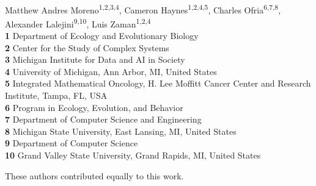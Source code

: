 \begin{flushleft}
{\Large
\textbf{} %
}
{\large
\textit{} %
}
\newline
\\
Matthew Andres Moreno\textsuperscript{1,2,3,4\Yinyang*},
Cameron Haynes\textsuperscript{1,2,4,5\Yinyang},
Charles Ofria\textsuperscript{6,7,8},
Alexander Lalejini\textsuperscript{9,10\ddag},
Luis Zaman\textsuperscript{1,2,4\ddag}
\\
\bigskip
\textbf{1} Department of Ecology and Evolutionary Biology\\
\textbf{2} Center for the Study of Complex Systems\\
\textbf{3} Michigan Institute for Data and AI in Society\\
\textbf{4} University of Michigan, Ann Arbor, MI, United States\\
\textbf{5} Integrated Mathematical Oncology, H. Lee Moffitt Cancer Center and Research Institute, Tampa, FL, USA\\
\textbf{6} Program in Ecology, Evolution, and Behavior\\
\textbf{7} Department of Computer Science and Engineering\\
\textbf{8} Michigan State University, East Lansing, MI, United States\\
\textbf{9} Department of Computer Science\\
\textbf{10} Grand Valley State University, Grand Rapids, MI, United States\\
\bigskip

%
%
\Yinyang These authors contributed equally to this work.


\end{flushleft}

